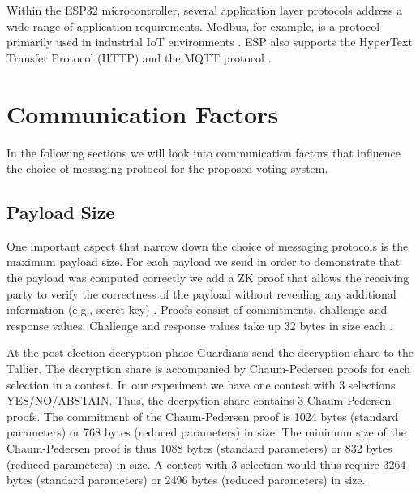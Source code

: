 Within the ESP32 microcontroller, several application layer protocols address a wide range of application requirements. Modbus, for example, is a protocol primarily used in industrial \ac{IoT} environments \cite[3]{protocols} \cite{esp-prog}. ESP also supports the HyperText Transfer Protocol (HTTP) and the \ac{MQTT} protocol \cite{esp-prog}. 

\section{Communication Factors}
In the following sections we will look into communication factors that influence the choice of messaging protocol for the proposed voting system.

\subsection{Payload Size}
One important aspect that narrow down the choice of messaging protocols is the maximum payload size. For each payload we send in order to demonstrate that the payload was computed correctly we add a \ac{ZK} proof that allows the receiving party to verify the correctness of the payload without revealing any additional information (e.g., secret key) \cite[13]{stuve-study}. Proofs consist of commitments, challenge and response values. Challenge and response values take up 32 bytes in size each \cite[23]{eg-paper}.

At the post-election decryption phase Guardians send the decryption share to the Tallier. The decryption share is accompanied by Chaum-Pedersen proofs for each selection in a contest. In our experiment we have one contest with 3 selections YES/NO/ABSTAIN. Thus, the decrpytion share contains 3 Chaum-Pedersen proofs. The commitment of the Chaum-Pedersen proof is 1024 bytes (standard parameters) or 768 bytes (reduced parameters) in size. The minimum size of the Chaum-Pedersen proof is thus 1088 bytes (standard parameters) or 832 bytes (reduced parameters) in size. A contest with 3 selection would thus require 3264 bytes (standard parameters) or 2496 bytes (reduced parameters) in size.

